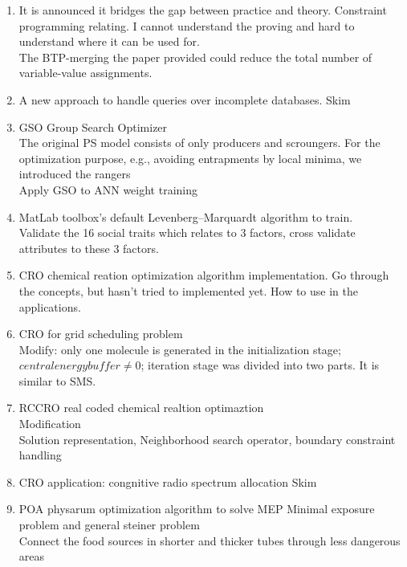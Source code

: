\documentclass[a4paper,12pt]{article}
\begin{document}
\begin{enumerate}
	\item It is announced it bridges the gap between practice and theory. Constraint programming relating. \cite{Cooper_Broken_2016} I cannot understand the proving and hard to understand where it can be used for.
	\\The BTP-merging the paper provided could reduce the total number of variable-value assignments.
	
	\item  A new approach to handle queries over incomplete databases. \cite{Libkin_Certain_2016} Skim
	
	\item GSO Group Search Optimizer\cite{He_Group_2009}
	\\The original PS model consists of only producers and scroungers. For the optimization purpose, e.g., avoiding entrapments by local minima, we introduced the rangers
	\\Apply GSO to ANN weight training
	
	\item MatLab toolbox’s default Levenberg–Marquardt algorithm to train.\cite{Vernon_Modeling_2014}
	\\Validate the 16 social traits which relates to 3 factors, cross validate attributes to these 3 factors.
	
	\item CRO chemical reation optimization algorithm implementation. Go through the concepts, but hasn't tried to implemented yet. How to use in the applications. \cite{Lam_Chemical_2012}
	
	\item CRO for grid scheduling problem \cite{Xu_Chemical_2011}
	\\Modify:   only one molecule is generated in the initialization stage; \(central energy buffer\neq 0\); iteration stage was divided into two parts. It is similar to SMS.
	
	\item RCCRO real coded chemical realtion optimaztion \cite{Lam_Real_2012}
	\\Modification
	\\Solution representation, Neighborhood search operator, boundary constraint handling
	
	\item CRO application: congnitive radio spectrum allocation\cite{Lam_Power_2013} Skim
	
	\item POA physarum optimization algorithm to solve MEP Minimal exposure problem and general steiner problem\cite{Song_A_2014} %
	\\Connect the food sources in shorter and thicker tubes through less dangerous areas
	

\end{enumerate}
\end{document}
